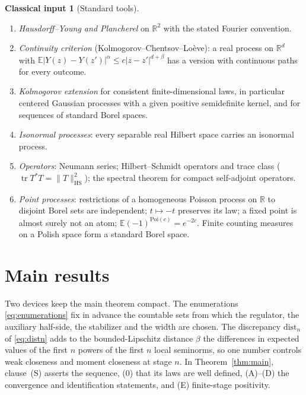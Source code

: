 \documentclass[11pt]{article}
\theoremstyle{plain}
\theoremstyle{definition}
\newtheorem{classical}{Classical input}
\theoremstyle{remark}
\newcommand{\R}{\mathbb{R}}
\newcommand{\E}{\mathbb{E}}
\newcommand{\dist}{\mathrm{dist}}
\DeclareMathOperator{\trace}{tr}
\begin{document}
\begin{classical}[Standard tools]
\begin{enumerate}[label=(\alph*)]
  $\xi_i,\eta_i$, $\E[{:}\xi_1\cdots\xi_k{:}\,{:}\eta_1\cdots\eta_l{:}]=\delta_{kl}
  \sum_{\pi\in S_k}\prod_i\E[\xi_i\eta_{\pi(i)}]$; the $k$-th chaos is the closed span of
  ${:}\xi_1\cdots\xi_k{:}$, chaoses of different order are orthogonal, chaos of
  order $\ge1$ has mean zero, and finite products of jointly Gaussian variables
  with dense span generate a dense subspace of each chaos.
\item \emph{Hausdorff--Young and Plancherel} on $\R^{2}$ with the stated Fourier
  convention.
\item \emph{Continuity criterion} (Kolmogorov--Chentsov--Lo\`eve): a real process on
  $\R^{d}$ with $\E|Y(z)-Y(z')|^{\alpha}\le c|z-z'|^{d+\beta}$ has a version with
  continuous paths for every outcome.
\item \emph{Kolmogorov extension} for consistent finite-dimensional laws, in
  particular centered Gaussian processes with a given positive semidefinite
  kernel, and for sequences of standard Borel spaces.
\item \emph{Isonormal processes}: every separable real Hilbert space carries an
  isonormal process.
\item \emph{Operators}: Neumann series; Hilbert--Schmidt operators and trace class
  ($\trace T^{*}T=\|T\|^{2}_{\mathrm{HS}}$); the spectral theorem for compact
  self-adjoint operators.
\item \emph{Point processes}: restrictions of a homogeneous Poisson process on $\R$
  to disjoint Borel sets are independent; $t\mapsto-t$ preserves its law; a fixed
  point is almost surely not an atom; $\E(-1)^{\mathrm{Poi}(c)}=e^{-2c}$. Finite
  counting measures on a Polish space form a standard Borel space.
\end{enumerate}
\end{classical}

\section{Main results}\label{sec:main}

Two devices keep the main theorem compact. The enumerations \eqref{eq:enumerations} fix in advance the countable sets from which the regulator, the auxiliary half-side, the stabilizer and the width are chosen. The discrepancy $\dist_n$ of \eqref{eq:distn} adds to the bounded-Lipschitz distance $\beta$ the differences in expected values of the first $n$ powers of the first $n$ local seminorms, so one number controls weak closeness and moment closeness at stage $n$. In Theorem~\ref{thm:main}, clause~(S) asserts the sequence, (0) that its laws are well defined, (A)--(D) the convergence and identification statements, and (E) finite-stage positivity.
\end{document}
